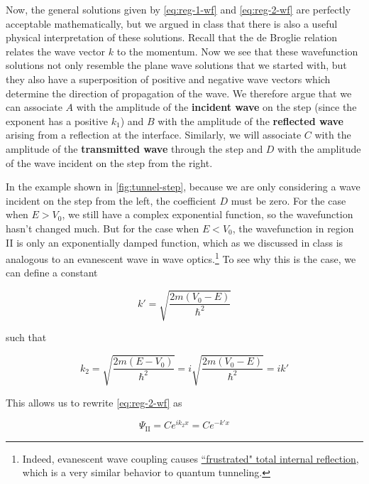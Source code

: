 Now, the general solutions given by \autoref{eq:reg-1-wf} and \ref{eq:reg-2-wf} are perfectly acceptable mathematically, but we argued in class that there is also a useful physical interpretation of these solutions. 
Recall that the de Broglie relation relates the wave vector $k$ to the momentum. 
Now we see that these wavefunction solutions not only resemble the plane wave solutions that we started with, but they also have a superposition of positive and negative wave vectors which determine the direction of propagation of the wave. 
We therefore argue that we can associate $A$ with the amplitude of the \textbf{incident wave} on the step (since the exponent has a positive $k_1$) and $B$ with the amplitude of the \textbf{reflected wave} arising from a reflection at the interface. 
Similarly, we will associate $C$ with the amplitude of the \textbf{transmitted wave} through the step and $D$ with the amplitude of the wave incident on the step from the right.

In the example shown in \autoref{fig:tunnel-step}, because we are only considering a wave incident on the step from the left, the coefficient $D$ must be zero. 
For the case when $E > V_0$, we still have a complex exponential function, so the wavefunction hasn't changed much. 
But for the case when $E < V_0$, the wavefunction in region II is only an exponentially damped function, which as we discussed in class is analogous to an evanescent wave in wave optics.\footnote{Indeed, evanescent wave coupling causes \href{https://en.wikipedia.org/wiki/Total_internal_reflection\#Frustrated_total_internal_reflection}{``frustrated" total internal reflection}, which is a very similar behavior to quantum tunneling.} 
To see why this is the case, we can define a constant

\begin{equation}
	k' = \sqrt{\frac{2m(V_0-E)}{\hbar^2}} \label{eq:reg-2-kp}
\end{equation}

\noindent such that

\begin{equation*}
	k_2 = \sqrt{\frac{2m(E-V_0)}{\hbar^2}} = i\sqrt{\frac{2m(V_0-E)}{\hbar^2}} = ik'
\end{equation*}

This allows us to rewrite \autoref{eq:reg-2-wf} as 

\begin{equation}
	\Psi_{\text{II}} = Ce^{ik_2x} = Ce^{-k'x} \label{eq:reg-2-wfp}
\end{equation}

